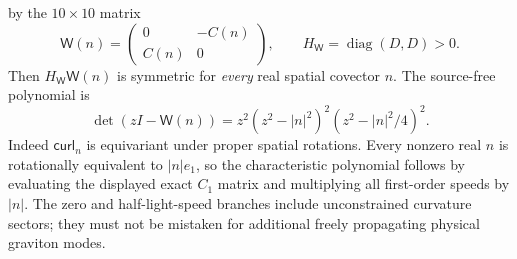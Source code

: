 \documentclass[11pt,a4paper]{article}
\begin{document}
by the $10\times10$ matrix
\begin{equation}\label{eq:weyl-principal}
\mathsf W(n)=
\begin{pmatrix}
0&-C(n)\\ C(n)&0
\end{pmatrix},\qquad
H_{\mathsf W}=\operatorname{diag}(D,D)>0 .
\end{equation}
Then $H_{\mathsf W}\mathsf W(n)$
is symmetric for \emph{every}
real spatial covector $n$.
The source-free polynomial is
\begin{equation}\label{eq:weyl-poly}
\det(zI-\mathsf W(n))
=z^2(z^2-|n|^2)^2
(z^2-|n|^2/4)^2.
\end{equation}
Indeed $\mathsf{curl}_n$ is
equivariant under proper spatial
rotations. Every nonzero real $n$
is rotationally equivalent to
$|n|e_1$, so the characteristic
polynomial follows by evaluating
the displayed exact $C_1$ matrix
and multiplying all first-order
speeds by $|n|$. The zero and
half-light-speed
branches include unconstrained
curvature sectors; they must not
be mistaken for additional freely
propagating physical graviton modes.
\end{document}
